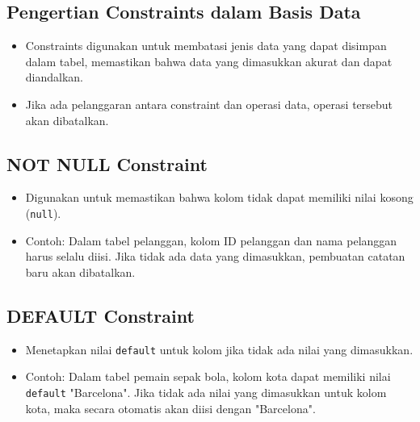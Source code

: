 \documentclass{article}
\begin{document}
\subsection{Pengertian Constraints dalam Basis Data}
\begin{itemize}
    \item Constraints digunakan untuk membatasi jenis data yang dapat disimpan dalam tabel, memastikan bahwa data yang dimasukkan akurat dan dapat diandalkan.
    \item Jika ada pelanggaran antara constraint dan operasi data, operasi tersebut akan dibatalkan.
\end{itemize}

\subsection{NOT NULL Constraint}
\begin{itemize}
    \item Digunakan untuk memastikan bahwa kolom tidak dapat memiliki nilai kosong (\texttt{null}).
    \item Contoh: Dalam tabel pelanggan, kolom ID pelanggan dan nama pelanggan harus selalu diisi. Jika tidak ada data yang dimasukkan, pembuatan catatan baru akan dibatalkan.
\end{itemize}

\subsection{DEFAULT Constraint}
\begin{itemize}
    \item Menetapkan nilai \texttt{default} untuk kolom jika tidak ada nilai yang dimasukkan.
    \item Contoh: Dalam tabel pemain sepak bola, kolom kota dapat memiliki nilai \texttt{default} "Barcelona". Jika tidak ada nilai yang dimasukkan untuk kolom kota, maka secara otomatis akan diisi dengan "Barcelona".
\end{itemize}
\end{document}
